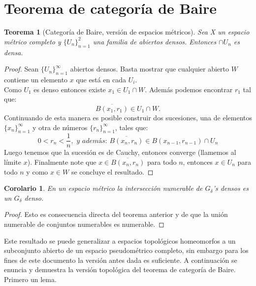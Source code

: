\documentclass{article}
\newtheorem{theorem}{Teorema}[section]
\newtheorem{corollary}{Corolario}[theorem]
\theoremstyle{definition}
\newcommand{\suc}[4][\infty]{\{{#2_#3}\}_{#3=#4}^#1}
\begin{document}
\section{Teorema de categoría de Baire}
\begin{theorem}[Categoría de Baire, versión de espacios métricos]
Sea X un espacio métrico completo y $\{U_n\}_{n=1}^2$ una familia de abiertos densos. Entonces $\cap U_n$ es densa.
\end{theorem}
\begin{proof}
Sean $\{U_n\}_{n=1}^\infty$ abiertos densos. Basta mostrar que cualquier abierto $W$ contiene un elemento $x$ que está en cada $U_i$.\\
Como $U_1$ es denso entonces existe $x_1 \in U_1\cap W$. Además podemos encontrar $r_1$ tal que:\\
$$
\overline{B(x_1,r_1)}\in U_1\cap W.
$$
Continuando de esta manera es posible construir dos sucesiones, una de elementos $\suc{x}{n}{1}$ y otra de números $\suc{r}{n}{1}$, tales que:\\
$$
0<r_n<\frac{1}{n}, \textit{ y además: } \overline{B(x_n,r_n)} \in B(x_{n-1},r_{n-1})\cap U_n
$$
Luego tenemos que la sucesión es de Cauchy, entonces converge (llamemos al límite $x$). Finalmente note que $x\in \overline{B(x_n,r_n)}$ para todo $n$, entonces $x\in U_n$ para todo $n$ y como $x\in W$ se concluye el resultado.
\end{proof}

\begin{corollary}\label{coroBaireGDelta}
En un espacio métrico la intersección numerable de $G_\delta$'s densos es un $G_\delta$ denso.
\end{corollary}

\begin{proof}
Esto es consecuencia directa del teorema anterior y de que la unión numerable de conjuntos numerables es numerable. 
\end{proof}

Este resultado se puede generalizar a espacios topológicos homeomorfos a un subconjunto abierto de un espacio pseudométrico completo, sin embargo para los fines de este documento la versión antes dada es suficiente. A continuación se enuncia y demuestra la versión topológica del teorema de categoría de Baire. Primero un lema.
\end{document}

